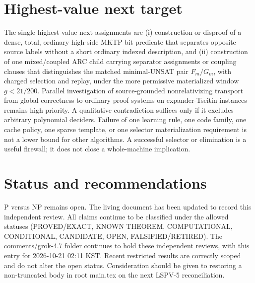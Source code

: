 \documentclass[11pt]{article}
\begin{document}
\section{Highest-value next target}
The single highest-value next assignments are (i) construction or disproof of a dense, total, ordinary high-side MKTP bit predicate that separates opposite source labels without a short ordinary indexed description, and (ii) construction of one mixed/coupled ARC child carrying separator assignments or coupling clauses that distinguishes the matched minimal-UNSAT pair \(F_m/G_m\), with charged selection and replay, under the more permissive materialized window \(g<21/200\). Parallel investigation of source-grounded nonrelativizing transport from global correctness to ordinary proof systems on expander-Tseitin instances remains high priority. A qualitative contradiction suffices only if it excludes arbitrary polynomial deciders. Failure of one learning rule, one code family, one cache policy, one sparse template, or one selector materialization requirement is not a lower bound for other algorithms. A successful selector or elimination is a useful firewall; it does not close a whole-machine implication.

\section{Status and recommendations}
P versus NP remains open. The living document has been updated to record this independent review. All claims continue to be classified under the allowed statuses (PROVED/EXACT, KNOWN THEOREM, COMPUTATIONAL, CONDITIONAL, CANDIDATE, OPEN, FALSIFIED/RETIRED). The comments/grok-4.7 folder continues to hold these independent reviews, with this entry for 2026-10-21 02:11 KST. Recent restricted results are correctly scoped and do not alter the open status. Consideration should be given to restoring a non-truncated body in root main.tex on the next LSPV-5 reconciliation.

\end{document}
